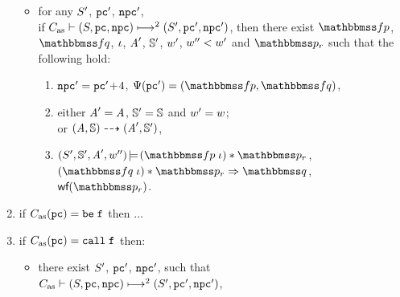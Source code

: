 \begin{definition}
\begin{enumerate}[1.]
\begin{itemize}
                \item for any $\state'$, {\em $\pc'$}, {\em $\npc'$}, \\ if
                {\em $\multilptrans{\asmimp}{2}{(\state, \pc, \npc)}{(\state', \pc', \npc')}$},
                then there exist
                $\relspecpre$, $\relspecpost$, $\lgvl$,
                $\primcom'$, $\hpstate'$, $\word'$,
                $\word'' < \word'$ and {\em $\relastP_r$}
                such that the following hold:
                \begin{enumerate}[(1)]
                    \item %
                        {\em $\npc' = \pc' \!+\! 4$},
                        {\em $\Cspec (\pc') = (\relspecpre, \relspecpost)$},
                    \item either $\primcom' = \primcom$,
                    $\hpstate' = \hpstate$ and $\word' = \word$; \\
                    or
                    $\primTrans{(\primcom, \hpstate)}
                        {(\primcom', \hpstate')}$,
                    \item
                        {\em $\asrtmodel{(\state', \hpstate', \primcom', \word'')}
                        {(\relspecpre \; \lgvl) \sepstar \relastP_r}$},
                        $(\relspecpost \; \lgvl) \sepstar \relastP_r
                        \Rightarrow \relastQ$, {\em $\wfFrm(\relastP_r)$}.
                \end{enumerate}
            \end{itemize}

            \item if {\em $\asmimp(\pc) = \be \; \lab{}$} then $\dots$
		
            \item if {\em $\asmimp (\pc) = \call \; \lab{}$} then:
            \begin{itemize}
                \item there exist {\em $\state'$}, {\em $\pc'$}, {\em $\npc'$}, such that
                \\
                {\em $\multilptrans{\asmimp}{2}{(\state, \pc, \npc)}
                    {(\state', \pc', \npc')}$},


\end{itemize}
\end{enumerate}
\end{definition}
